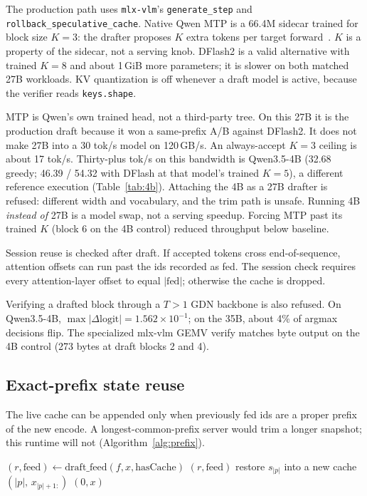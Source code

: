 The production path uses \texttt{mlx-vlm}’s \texttt{generate\_step} and \texttt{rollback\_speculative\_cache}. Native Qwen MTP is a 66.4M sidecar trained for block size $K{=}3$: the drafter proposes $K$ extra tokens per target forward~\citep{qwen3,mlxlm990}. $K$ is a property of the sidecar, not a serving knob. DFlash2 is a valid alternative with trained $K{=}8$ and about 1\,GiB more parameters; it is slower on both matched 27B workloads. KV quantization is off whenever a draft model is active, because the verifier reads \texttt{keys.shape}.

MTP is Qwen’s own trained head, not a third-party tree. On this 27B it is the production draft because it won a same-prefix A/B against DFlash2. It does not make 27B into a 30 tok/s model on 120\,GB/s. An always-accept $K{=}3$ ceiling is about 17 tok/s. Thirty-plus tok/s on this bandwidth is Qwen3.5-4B (32.68 greedy; 46.39 / 54.32 with DFlash at that model’s trained $K{=}5$), a different reference execution (Table~\ref{tab:4b}). Attaching the 4B as a 27B drafter is refused: different width and vocabulary, and the trim path is unsafe. Running 4B \emph{instead of} 27B is a model swap, not a serving speedup. Forcing MTP past its trained $K$ (block 6 on the 4B control) reduced throughput below baseline.

Session reuse is checked after draft. If accepted tokens cross end-of-sequence, attention offsets can run past the ids recorded as fed. The session check requires every attention-layer offset to equal $|{\mathrm{fed}}|$; otherwise the cache is dropped.

Verifying a drafted block through a $T{>}1$ GDN backbone is also refused. On Qwen3.5-4B, $\max|\Delta\mathrm{logit}|=1.562{\times}10^{-1}$; on the 35B, about 4\% of argmax decisions flip. The specialized mlx-vlm GEMV verify matches byte output on the 4B control (273 bytes at draft blocks 2 and 4).

\subsection{Exact-prefix state reuse}
\label{sec:prefix}

The live cache can be appended only when previously fed ids are a proper prefix of the new encode. A longest-common-prefix server would trim a longer snapshot; this runtime will not (Algorithm~\ref{alg:prefix}).

\begin{algorithm}[t]
\caption{Exact-prefix reuse without partial trimming}
\label{alg:prefix}
\begin{algorithmic}[1]
\State $(r,\mathrm{feed})\leftarrow \mathrm{draft\_feed}(f,x,\mathrm{hasCache})$
 \Return $(r,\mathrm{feed})$
\EndIf
{}
  \State restore $s_{|p|}$ into a new cache
  \State \Return $(|p|,\, x_{|p|+1:})$
\EndIf
\State \Return $(0,x)$
\end{algorithmic}
\end{algorithm}


